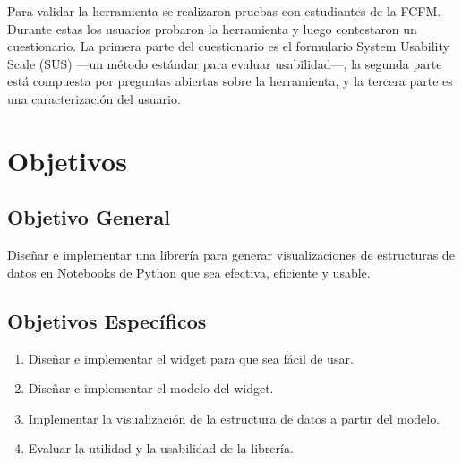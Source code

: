 Para validar la herramienta se realizaron pruebas con estudiantes de la FCFM. Durante estas los usuarios probaron la herramienta y luego contestaron un cuestionario. La primera parte del cuestionario es el formulario System Usability Scale (SUS) ---un método estándar para evaluar usabilidad---, la segunda parte está compuesta por preguntas abiertas sobre la herramienta, y la tercera parte es una caracterización del usuario.

\section{Objetivos}

\subsection*{Objetivo General}\label{sec:obj-g}

Diseñar e implementar una librería para generar visualizaciones de estructuras de datos en Notebooks de Python que sea efectiva, eficiente y usable.

\subsection*{Objetivos Específicos}\label{sec:obj-e}

\begin{enumerate}
  \item Diseñar e implementar el widget para que sea fácil de usar.
  \item Diseñar e implementar el modelo del widget.
  \item Implementar la visualización de la estructura de datos a partir del modelo.
  \item Evaluar la utilidad y la usabilidad de la librería.
\end{enumerate}
